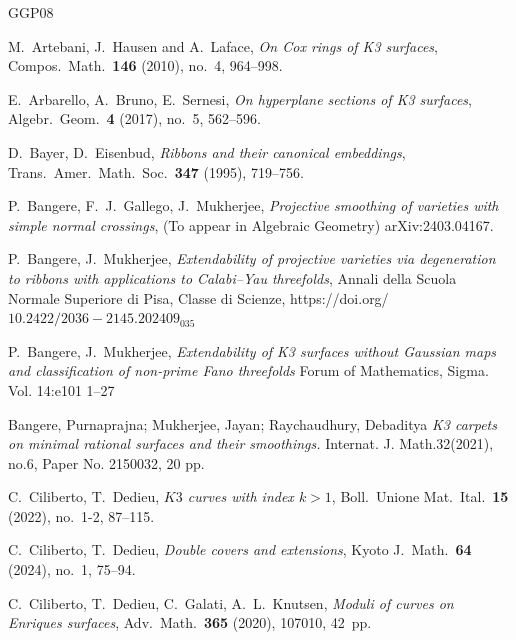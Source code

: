 \documentclass[11pt,twoside]{amsart}
\theoremstyle{plain}
\theoremstyle{definition}
\begin{document}
\begin{thebibliography}{GGP08}

 M.~Artebani, J.~Hausen and A.~Laface, \emph{On Cox rings of K3 surfaces}, Compos.\ Math.\ \textbf{146} (2010), no.~4, 964--998.

 E.~Arbarello, A.~Bruno, E.~Sernesi, \emph{On hyperplane sections of K3 surfaces}, Algebr.\ Geom.\ \textbf{4} (2017), no.~5, 562--596.

 D.~Bayer, D.~Eisenbud, \emph{Ribbons and their canonical embeddings}, Trans.\ Amer.\ Math.\ Soc.\ \textbf{347} (1995), 719--756.

 P.~Bangere, F.~J.~Gallego, J.~Mukherjee, \emph{Projective smoothing of varieties with simple normal crossings}, (To appear in Algebraic Geometry) arXiv:2403.04167.

 P.~Bangere, J.~Mukherjee, \emph{Extendability of projective varieties via degeneration to ribbons with applications to Calabi--Yau threefolds}, Annali della Scuola Normale Superiore di Pisa, Classe di Scienze,  https://doi.org/$10.2422/2036-2145.202409_035$

 P.~Bangere, J.~Mukherjee, \emph{Extendability of K3 surfaces without Gaussian maps and classification of non-prime Fano threefolds}
Forum of Mathematics, Sigma. Vol. 14:e101 1–27

Bangere, Purnaprajna; Mukherjee, Jayan; Raychaudhury, Debaditya
\emph{K3 carpets on minimal rational surfaces and their smoothings.}
Internat. J. Math.32(2021), no.6, Paper No. 2150032, 20 pp.





 C.~Ciliberto, T.~Dedieu, \emph{$K3$ curves with index $k>1$}, Boll.\ Unione Mat.\ Ital.\ \textbf{15} (2022), no.~1-2, 87--115.

 C.~Ciliberto, T.~Dedieu, \emph{Double covers and extensions}, Kyoto J.\ Math.\ \textbf{64} (2024), no.~1, 75--94.

 C.~Ciliberto, T.~Dedieu, C.~Galati, A.~L.~Knutsen, \emph{Moduli of curves on Enriques surfaces}, Adv.\ Math.\ \textbf{365} (2020), 107010, 42~pp.


\end{thebibliography}
\end{document}
